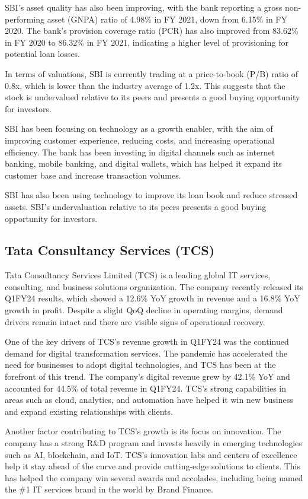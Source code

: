 SBI's asset quality has also been improving, with the bank reporting a gross non-performing asset (GNPA) ratio of 4.98\% in FY 2021, down from 6.15\% in FY 2020. The bank's provision coverage ratio (PCR) has also improved from 83.62\% in FY 2020 to 86.32\% in FY 2021, indicating a higher level of provisioning for potential loan losses.

In terms of valuations, SBI is currently trading at a price-to-book (P/B) ratio of 0.8x, which is lower than the industry average of 1.2x. This suggests that the stock is undervalued relative to its peers and presents a good buying opportunity for investors.

SBI has been focusing on technology as a growth enabler, with the aim of improving customer experience, reducing costs, and increasing operational efficiency. The bank has been investing in digital channels such as internet banking, mobile banking, and digital wallets, which has helped it expand its customer base and increase transaction volumes.

SBI has also been using technology to improve its loan book and reduce stressed assets. SBI's undervaluation relative to its peers presents a good buying opportunity for investors.

    \subsection{Tata Consultancy Services (TCS)} Tata Consultancy Services Limited (TCS) is a leading global IT services, consulting, and business solutions organization. The company recently released its Q1FY24 results, which showed a 12.6\% YoY growth in revenue and a 16.8\% YoY growth in profit. Despite a slight QoQ decline in operating margins, demand drivers remain intact and there are visible signs of operational recovery. 

One of the key drivers of TCS's revenue growth in Q1FY24 was the continued demand for digital transformation services. The pandemic has accelerated the need for businesses to adopt digital technologies, and TCS has been at the forefront of this trend. The company's digital revenue grew by 42.1\% YoY and accounted for 44.5\% of total revenue in Q1FY24. TCS's strong capabilities in areas such as cloud, analytics, and automation have helped it win new business and expand existing relationships with clients.

Another factor contributing to TCS's growth is its focus on innovation. The company has a strong R\&D program and invests heavily in emerging technologies such as AI, blockchain, and IoT. TCS's innovation labs and centers of excellence help it stay ahead of the curve and provide cutting-edge solutions to clients. This has helped the company win several awards and accolades, including being named the \#1 IT services brand in the world by Brand Finance.

